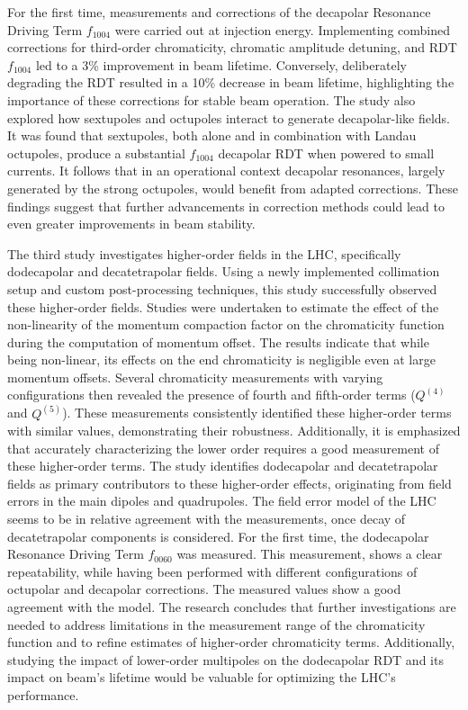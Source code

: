 {For the first time, measurements and corrections of the decapolar Resonance Driving
Term $f_{1004}$ were carried out at injection energy. 
Implementing combined corrections for third-order chromaticity, chromatic amplitude detuning, and
RDT $f_{1004}$ led to a 3\% improvement in beam lifetime. Conversely, deliberately degrading the RDT
resulted in a 10\% decrease in beam lifetime, highlighting the importance of these
corrections for stable beam operation. 
The study also explored how sextupoles and octupoles interact to generate decapolar-like fields. It
was found that sextupoles, both alone and in combination with Landau octupoles, produce a substantial
$f_{1004}$ decapolar RDT when powered to small currents. It follows that in an operational
context decapolar resonances, largely generated by the strong octupoles, would benefit from adapted
corrections.
These findings suggest that further advancements in correction methods could lead to even greater
improvements in beam stability.


The third study investigates higher-order fields in the LHC, specifically dodecapolar and
decatetrapolar fields. Using a newly implemented collimation setup and custom post-processing
techniques, this study successfully observed these higher-order fields. Studies were 
undertaken to estimate the effect of the non-linearity of the momentum compaction factor on the 
chromaticity function during the computation of momentum offset. The 
results indicate that while being non-linear, its effects on the end chromaticity is negligible even 
at large momentum offsets.
Several chromaticity measurements with varying configurations then revealed the presence of fourth
and fifth-order terms ($Q^{(4)}$ and $Q^{(5)}$). These measurements consistently identified these
higher-order terms with similar values, demonstrating their robustness. Additionally, it is 
emphasized that accurately characterizing the lower order requires a good measurement of these 
higher-order terms. The study identifies dodecapolar and decatetrapolar fields as primary
contributors to these higher-order effects, originating from field errors in the main dipoles and
quadrupoles. The field error model of the LHC seems to be in relative agreement with the
measurements, once decay of decatetrapolar components is considered.
For the first time, the dodecapolar Resonance Driving Term $f_{0060}$ was measured. This measurement,
shows a clear repeatability, while having been performed with different configurations of octupolar
and decapolar corrections. The measured values show a good agreement with the model. 
The research concludes that further investigations are needed to address limitations in the
measurement range of the chromaticity function and to refine estimates of higher-order chromaticity
terms. Additionally, studying the impact of lower-order multipoles on the dodecapolar RDT and its
impact on beam's lifetime would be valuable for optimizing the LHC's performance.


}
